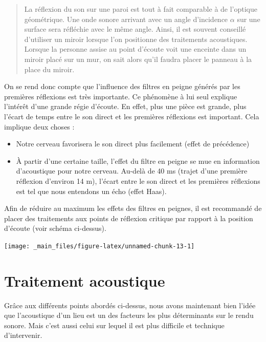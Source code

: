 \documentclass[
]{book}
\providecommand{\tightlist}{%
  \setlength{\itemsep}{0pt}\setlength{\parskip}{0pt}}
\begin{document}
\begin{quote}
La réflexion du son sur une paroi est tout à fait comparable à de l'optique géométrique. Une onde sonore arrivant avec un angle d'incidence \(\alpha\) sur une surface sera réfléchie avec le même angle. Ainsi, il est souvent conseillé d'utiliser un miroir lorsque l'on positionne des traitements acoustiques. Lorsque la personne assise au point d'écoute voit une enceinte dans un miroir placé sur un mur, on sait alors qu'il faudra placer le panneau à la place du miroir.
\end{quote}

On se rend donc compte que l'influence des filtres en peigne générés par les premières réflexions est très importante. Ce phénomène à lui seul explique l'intérêt d'une grande régie d'écoute. En effet, plus une pièce est grande, plus l'écart de temps entre le son direct et les premières réflexions est important. Cela implique deux choses :

\begin{itemize}
\tightlist
\item
  Notre cerveau favorisera le son direct plus facilement (effet de précédence)
\item
  À partir d'une certaine taille, l'effet du filtre en peigne se mue en information d'acoustique pour notre cerveau. Au-delà de 40 ms (trajet d'une première réflexion d'environ 14 m), l'écart entre le son direct et les premières réflexions est tel que nous entendons un écho (effet Haas).
\end{itemize}

Afin de réduire au maximum les effets des filtres en peignes, il est recommandé de placer des traitements aux points de réflexion critique par rapport à la position d'écoute (voir schéma ci-dessus).

\begin{center}\texttt{[image: \_main\_files/figure-latex/unnamed-chunk-13-1]} \end{center}

\hypertarget{traitement-acoustique}{%
\section{Traitement acoustique}\label{traitement-acoustique}}

Grâce aux différents points abordés ci-dessus, nous avons maintenant bien l'idée que l'acoustique d'un lieu est un des facteurs les plus déterminants sur le rendu sonore. Mais c'est aussi celui sur lequel il est plus difficile et technique d'intervenir.
\end{document}
